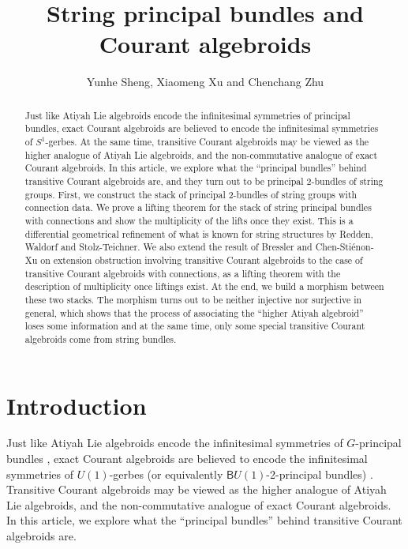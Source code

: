 \documentclass[letterpaper,10pt, oneside]{article} %
\newcommand{\B}{\mathsf{B}}%
\begin{document}
\title{
{String principal bundles and Courant algebroids } }
\author{Yunhe Sheng,
Xiaomeng Xu  and
Chenchang Zhu }
\date{}

\maketitle {}



\begin{abstract}
Just like Atiyah Lie algebroids encode the infinitesimal symmetries of
principal bundles, exact Courant algebroids are believed to encode the
infinitesimal symmetries of $S^1$-gerbes. At the same time, transitive Courant
algebroids may be viewed as the higher analogue of
Atiyah Lie algebroids, and the non-commutative analogue of exact
Courant algebroids. In this article, we explore what the ``principal
bundles'' behind transitive Courant algebroids are, and they turn out
to be principal 2-bundles of string groups. First, we construct the stack of principal 2-bundles of string groups with connection data.
We prove a lifting theorem for the stack of string principal bundles with connections and show the multiplicity of the lifts once they exist. This is a differential geometrical refinement of what is known for string structures by Redden, Waldorf and Stolz-Teichner. We also extend the result of Bressler and Chen-Sti\'enon-Xu on extension obstruction involving transitive Courant algebroids to the case of transitive Courant algebroids with connections, as a lifting theorem with the description of multiplicity once liftings exist. At the end, we build a morphism between these two stacks. The morphism turns out to be neither injective nor surjective in general, which shows that the process of associating the ``higher Atiyah algebroid'' loses some information and at the same time, only some special transitive Courant algebroids come from string bundles.

\end{abstract}

\setcounter{tocdepth}{2}
\tableofcontents

\section{Introduction}

Just like Atiyah Lie algebroids encode the infinitesimal symmetries of $G$-principal bundles \cite{Atiyah,MK2}, exact Courant algebroids are believed to encode the infinitesimal symmetries of $U(1)$-gerbes (or equivalently $\B U(1)$-2-principal bundles) \cite{Bressler:ca,Col,Rogers:localobser,sevlet, Rogers:prequan}. Transitive Courant algebroids may be viewed as the higher analogue of Atiyah Lie algebroids, and the non-commutative analogue of exact Courant algebroids. In this article, we explore what the ``principal bundles'' behind transitive Courant algebroids are.
\end{document}
